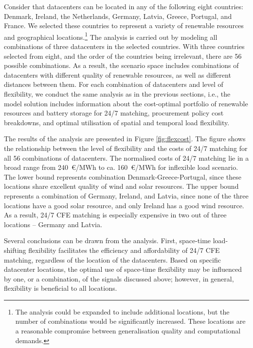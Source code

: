 Consider that datacenters can be located in any of the following eight countries: Denmark, Ireland, the Netherlands, Germany, Latvia, Greece, Portugal, and France. We selected these countries to represent a variety of renewable resources and geographical locations.\footnote{The analysis could be expanded to include additional locations, but the number of combinations would be significantly increased. These locations are a reasonable compromise between generalisation quality and computational demands.} The analysis is carried out by modeling all combinations of three datacenters in the selected countries. With three countries selected from eight, and the order of the countries being irrelevant, there are 56 possible combinations. As a result, the scenario space includes combinations of datacenters with different quality of renewable resources, as well as different distances between them.
For each combination of datacenters and level of flexibility, we conduct the same analysis as in the previous sections, i.e., the model solution includes information about the cost-optimal portfolio of renewable resources and battery storage for 24/7 matching, procurement policy cost breakdowns, and optimal utilisation of spatial and temporal load flexibility.

The results of the analysis are presented in Figure \ref{fig:flexcost}. The figure shows the relationship between the level of flexibility and the costs of 24/7 matching for all 56 combinations of datacenters. The normalised costs of 24/7 matching lie in a broad range from 240~\euro/MWh to ca. 160~\euro/MWh for inflexible load scenario. The lower bound represents combination Denmark-Greece-Portugal, since these locations share excellent quality of wind and solar resources. The upper bound represents a combination of Germany, Ireland, and Latvia, since none of the three locations have a good solar resource, and only Ireland has a good wind resource.  As a result, 24/7 CFE matching is especially expensive in two out of three locations -- Germany and Latvia.

Several conclusions can be drawn from the analysis. First, space-time load-shifting flexibility facilitates the efficiency and affordability of 24/7 CFE matching, regardless of the location of the datacenters. Based on specific datacenter locations, the optimal use of space-time flexibility may be influenced by one, or a combination, of the signals discussed above; however, in general, flexibility is beneficial to all locations.

